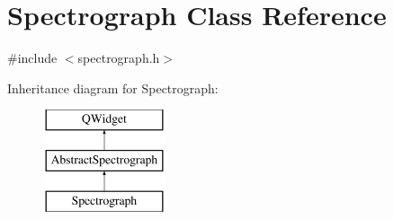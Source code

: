 \hypertarget{class_spectrograph}{\section{Spectrograph Class Reference}
\label{class_spectrograph}
}


{\ttfamily \#include $<$spectrograph.\-h$>$}

Inheritance diagram for Spectrograph\-:\begin{figure}[H]
\begin{center}
\leavevmode
\includegraphics[height=3.000000cm]{class_spectrograph}
\end{center}
\end{figure}

